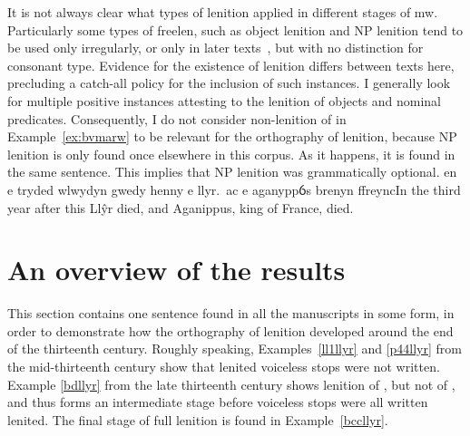 It is not always clear what types of lenition applied in different
stages of \gls{mw}. Particularly some types of \gls{freelen},
such as object lenition and NP lenition tend to be used only irregularly,
or only in later texts~\autocite{van_sluis_development_2014}, but
with no distinction for consonant type. Evidence for the existence of
lenition differs between texts here, precluding a catch-all policy for
the inclusion of such instances. I generally look for multiple positive
instances attesting to the lenition of objects and nominal predicates.
Consequently, I do not consider non-lenition of  in
Example~\ref{ex:bvmarw} to be relevant for the orthography of lenition,
because NP lenition is only found once elsewhere in this corpus.
As it happens, it is found in the same sentence.
This implies that NP lenition was grammatically optional.
{en e tryded wlwydyn gwedy henny e  llyr.\ ac e  aganyppỽs brenyn ffreync}{In the third year after this Llŷr died, and Aganippus, king of France, died.}


\section{An overview of the results}
\label{sec:comparison-versions}
This section contains one sentence found in all the manuscripts in some form, in order to demonstrate how the orthography of lenition developed around the end of the thirteenth century.
Roughly speaking, Examples~\ref{ll1llyr} and \ref{p44llyr} from the mid-thirteenth century show that lenited voiceless stops were not written.
Example \ref{bdllyr} from the late thirteenth century shows lenition of , but not of , and thus forms an intermediate stage before voiceless stops were all written lenited.
The final stage of full lenition is found in Example~\ref{bccllyr}.


